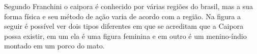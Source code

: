 Segundo Franchini o caipora é conhecido por várias regiões do brasil, mas a sua forma física e seu método de ação varia de acordo com a região.
Na figura a seguir é possível ver dois tipos diferentes em que se acreditam que  a Caipora possa existir, em um ela é uma figura feminina e em outro é um menino-índio montado em um porco do mato.

\begin{figure}[h!]
		\centering
	\end{figure}
